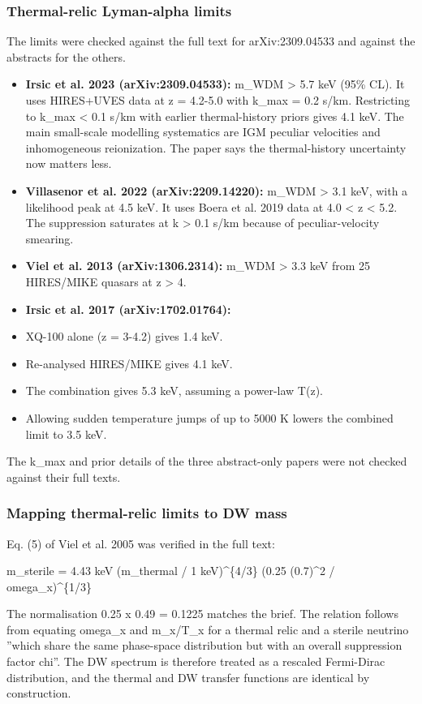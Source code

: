 \documentclass[11pt,a4paper]{article}
\begin{document}
\subsubsection{Thermal-relic Lyman-alpha limits}
The limits were checked against the full text for arXiv:2309.04533 and against the abstracts for the others.

\begin{itemize}
  \item \textbf{Irsic et al. 2023 (arXiv:2309.04533):} m\_WDM \textgreater{} 5.7 keV (95\% CL). It uses HIRES+UVES data at z = 4.2-5.0 with k\_max = 0.2 s/km. Restricting to k\_max \textless{} 0.1 s/km with earlier thermal-history priors gives 4.1 keV. The main small-scale modelling systematics are IGM peculiar velocities and inhomogeneous reionization. The paper says the thermal-history uncertainty now matters less.
  \item \textbf{Villasenor et al. 2022 (arXiv:2209.14220):} m\_WDM \textgreater{} 3.1 keV, with a likelihood peak at 4.5 keV. It uses Boera et al. 2019 data at 4.0 \textless{} z \textless{} 5.2. The suppression saturates at k \textgreater{} 0.1 s/km because of peculiar-velocity smearing.
  \item \textbf{Viel et al. 2013 (arXiv:1306.2314):} m\_WDM \textgreater{} 3.3 keV from 25 HIRES/MIKE quasars at z \textgreater{} 4.
  \item \textbf{Irsic et al. 2017 (arXiv:1702.01764):}
  \item XQ-100 alone (z = 3-4.2) gives 1.4 keV.
  \item Re-analysed HIRES/MIKE gives 4.1 keV.
  \item The combination gives 5.3 keV, assuming a power-law T(z).
  \item Allowing sudden temperature jumps of up to 5000 K lowers the combined limit to 3.5 keV.
\end{itemize}
The k\_max and prior details of the three abstract-only papers were not checked against their full texts.

\subsubsection{Mapping thermal-relic limits to DW mass}
Eq. (5) of Viel et al. 2005 was verified in the full text:

m\_sterile = 4.43 keV (m\_thermal / 1 keV)\textasciicircum{}\{4/3\} (0.25 (0.7)\textasciicircum{}2 / omega\_x)\textasciicircum{}\{1/3\}

The normalisation 0.25 x 0.49 = 0.1225 matches the brief. The relation follows from equating omega\_x and m\_x/T\_x for a thermal relic and a sterile neutrino ''which share the same phase-space distribution but with an overall suppression factor chi''. The DW spectrum is therefore treated as a rescaled Fermi-Dirac distribution, and the thermal and DW transfer functions are identical by construction.
\end{document}

